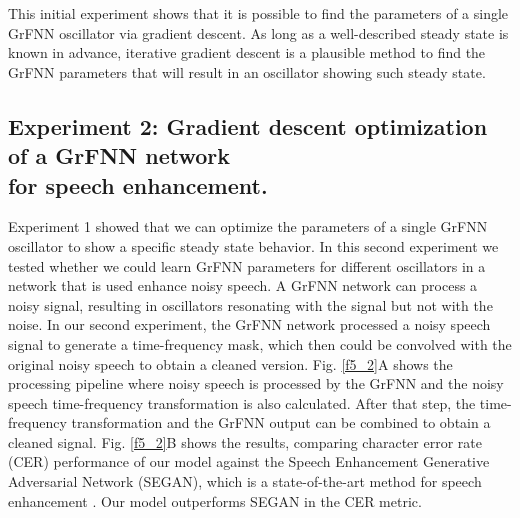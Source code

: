\documentclass{report}
\begin{document}
This initial experiment shows that it is possible to find the parameters of a single GrFNN oscillator via gradient descent. As long as a well-described steady state is known in advance, iterative gradient descent is a plausible method to find the GrFNN parameters that will result in an oscillator showing such steady state.

\subsection{Experiment 2: Gradient descent optimization of a GrFNN network \\ for speech enhancement.} 

Experiment 1 showed that we can optimize the parameters of a single GrFNN oscillator to show a specific steady state behavior. In this second experiment we tested whether we could learn GrFNN parameters for different oscillators in a network that is used enhance noisy speech. A GrFNN network can process a noisy signal, resulting in oscillators resonating with the signal but not with the noise. In our second experiment, the GrFNN network processed a noisy speech signal to generate a time-frequency mask, which then could be convolved with the original noisy speech to obtain a cleaned version. Fig.{} \ref{f5_2}A shows the processing pipeline where noisy speech is processed by the GrFNN and the noisy speech time-frequency transformation is also calculated. After that step, the time-frequency transformation and the GrFNN output can be combined to obtain a cleaned signal. Fig.{} \ref{f5_2}B shows the results, comparing character error rate (CER) performance of our model against the Speech Enhancement Generative Adversarial Network (SEGAN), which is a state-of-the-art method for speech enhancement \cite{pascual2017segan}. Our model outperforms SEGAN in the CER metric. 
\end{document}
